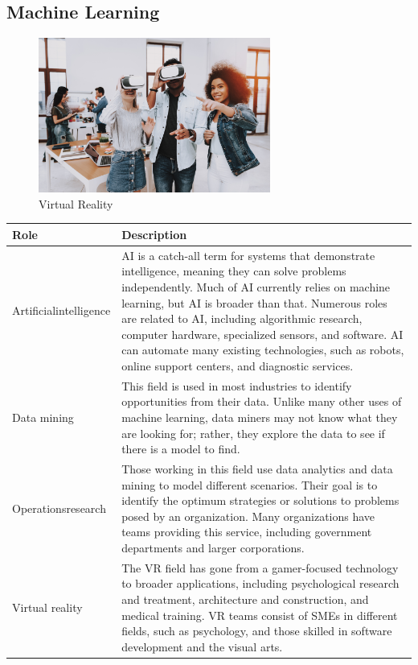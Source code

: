 \subsection{Machine Learning}

\begin{figure}[H]
	\begin{center}
		\caption{Virtual Reality}
		\vskip 4pt
		\includegraphics[height=2in]{images/careers/iStock-1051052494.small.jpg}
	\end{center}
\end{figure}

\begin{table}[H]
	\begin{center}
		\begin{tabular}{p{1in}|p{3.4in}} 
			\textbf{Role} & \textbf{Description}\\
			\hline
			Artificial\linebreak intelligence & AI is a catch-all term for systems that demonstrate intelligence, meaning they can solve problems independently. Much of AI currently relies on machine learning, but AI is broader than that. Numerous roles are related to AI, including algorithmic research, computer hardware, specialized sensors, and software. AI can automate many existing technologies, such as robots, online support centers, and diagnostic services.\\
			\hline
			Data mining & This field is used in most industries to identify opportunities from their data. Unlike many other uses of machine learning, data miners may not know what they are looking for; rather, they explore the data to see if there is a model to find.\\
			\hline
			Operations\linebreak research & Those working in this field use data analytics and data mining to model different scenarios. Their goal is to identify the optimum strategies or solutions to problems posed by an organization. Many organizations have teams providing this service, including government departments and larger corporations.\\
			\hline
			Virtual reality & The VR field has gone from a gamer-focused technology to broader applications, including psychological research and treatment, architecture and construction, and medical training. VR teams consist of SMEs in different fields, such as psychology, and those skilled in software development and the visual arts.\\
			\hline
		\end{tabular}
	\end{center}
\end{table}

